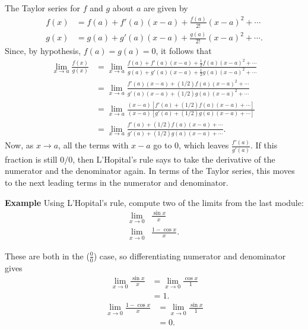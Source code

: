 \documentclass[a4paper]{book}
\begin{document}
\begin{sloppypar}
\begin{examplebox}
The Taylor series for $f$ and $g$ about $a$ are given by
\begin{align*}
f(x) &= f(a) + f'(a)(x-a) + \frac{f(a)}{2!}(x-a)^2+ \dotsb \\
g(x) &= g(a) + g'(a)(x-a) + \frac{g(a)}{2!}(x-a)^2 + \dotsb. 
\end{align*}
Since, by hypothesis, $f(a) = g(a) = 0$, it follows that
\begin{align*}
\lim_{x\rightarrow a} \frac{f(x)}{g(x)} &= \lim_{x \rightarrow a} \frac{ f(a) + f'(a)(x-a) + \frac{1}{2}f(a)(x-a)^2 + \dotsb}{g(a) + g'(a)(x-a) + \frac{1}{2}g(a)(x-a)^2+\dotsb} \\
&= \lim_{x\rightarrow a} \frac{f'(a) (x-a) +(1/2)f(a)(x-a)^2 + \dotsb}{g'(a)(x-a) + (1/2)g(a)(x-a)^2+ \dotsb} \\
&= \lim_{x \rightarrow a} \frac{(x-a)\left[f'(a) + (1/2)f(a)(x-a) + \dotsb \right]}{(x-a)\left[g'(a) + (1/2)g(a)(x-a) + \dotsb \right]} \\
&= \lim_{x \rightarrow a} \frac{f'(a) + (1/2)f(a)(x-a) + \dotsb }{g'(a) + (1/2) g(a)(x-a) + \dotsb}.
\end{align*}
Now, as $x \rightarrow a$, all the terms with $x-a$ go to 0, which leaves $\frac{f'(a)}{g'(a)}$. If this fraction is still $0/0$, then L'Hopital's rule says to take the derivative of the numerator and the denominator again. In terms of the Taylor series, this moves to the next leading terms in the numerator and denominator.
\end{examplebox}

\textbf{Example} Using L'Hopital's rule, compute two of the limits from the last module:
\begin{align*}
\lim_{x \rightarrow 0} & \frac{\sin x}{x} \\
\lim_{x \rightarrow 0} & \frac{1-\cos x}{x}. 
\end{align*}
\begin{examplebox}
These are both in the ($\frac{0}{0}$) case, so differentiating numerator and denominator gives
\begin{align*}
\lim_{x \rightarrow 0} \frac{\sin x}{x} &= \lim_{x \rightarrow 0} \frac{\cos x}{1} \\
&= 1. 
\end{align*}
\begin{align*}
\lim_{x \rightarrow 0} \frac{1-\cos x}{x} &= \lim_{x \rightarrow 0} \frac{\sin x}{1} \\
&= 0.
\end{align*}
\end{examplebox}


\end{sloppypar}
\end{document}
